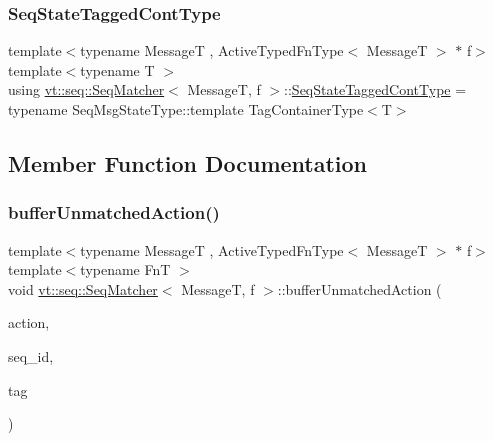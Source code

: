 \mbox{\label{structvt_1_1seq_1_1_seq_matcher_aeddaef880aa6f0dcc59486374d59a4cb}} 
\subsubsection{\texorpdfstring{Seq\+State\+Tagged\+Cont\+Type}{SeqStateTaggedContType}}
{\footnotesize\ttfamily template$<$typename MessageT , Active\+Typed\+Fn\+Type$<$ Message\+T $>$ $\ast$ f$>$ \\
template$<$typename T $>$ \\
using \hyperlink{structvt_1_1seq_1_1_seq_matcher}{vt\+::seq\+::\+Seq\+Matcher}$<$ MessageT, f $>$\+::\hyperlink{structvt_1_1seq_1_1_seq_matcher_aeddaef880aa6f0dcc59486374d59a4cb}{Seq\+State\+Tagged\+Cont\+Type} =  typename Seq\+Msg\+State\+Type\+::template Tag\+Container\+Type$<$T$>$}



\subsection{Member Function Documentation}
\mbox{\label{structvt_1_1seq_1_1_seq_matcher_aca3ab24ab457f57cd341c21aff0c0951}} 
\subsubsection{\texorpdfstring{buffer\+Unmatched\+Action()}{bufferUnmatchedAction()}}
{\footnotesize\ttfamily template$<$typename MessageT , Active\+Typed\+Fn\+Type$<$ Message\+T $>$ $\ast$ f$>$ \\
template$<$typename FnT $>$ \\
void \hyperlink{structvt_1_1seq_1_1_seq_matcher}{vt\+::seq\+::\+Seq\+Matcher}$<$ MessageT, f $>$\+::buffer\+Unmatched\+Action (\begin{DoxyParamCaption}\item[{FnT}]{action,  }\item[{\hyperlink{namespacevt_1_1seq_a3b612da217ac669d39c159f134ab8434}{Seq\+Type} const \&}]{seq\+\_\+id,  }\item[{\hyperlink{namespacevt_a84ab281dae04a52a4b243d6bf62d0e52}{Tag\+Type} const \&}]{tag }\end{DoxyParamCaption})\hspace{0.3cm}{\ttfamily [static]}}

